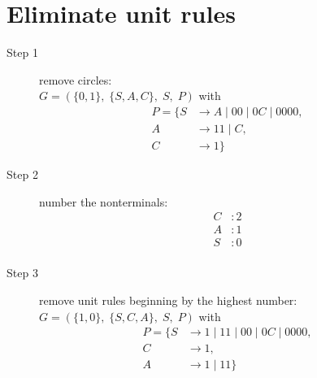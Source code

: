 \documentclass{article}
\begin{document}
\section{Eliminate unit rules}
\begin{description}
	\item[Step 1] remove circles: \\ 
	$G=\left(\{	0, 1\},\;\{ S, A, C\},\;S,\;P\right)$ with
	\begin{align*}
		P=\{	S &\rightarrow A\;|\;00\;|\;0C\;|\;0000, \\ 
		A &\rightarrow 11\;|\;C, \\ 
		C &\rightarrow 1\}
	\end{align*}
	\item[Step 2] number the nonterminals: \\ 
	\begin{align*}
	C&: 2\\ 
	A&: 1\\ 
	S&: 0\\ 
	\end{align*}
	\item[Step 3] remove unit rules beginning by the highest number: \\ 
$G=\left(\{1, 0\},\;\{ S, C, A\},\;S,\;P\right)$ with
\begin{align*}
	P=\{	S &\rightarrow 1\;|\;11\;|\;00\;|\;0C\;|\;0000, \\ 
	C &\rightarrow 1, \\ 
	A &\rightarrow 1\;|\;11\}
	\end{align*}
\end{description}
\end{document}
